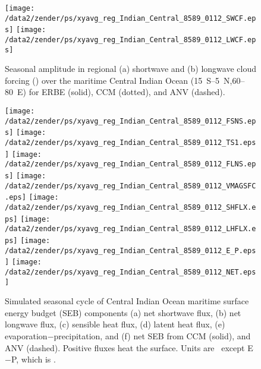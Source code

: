 \documentclass[twocolumn,final]{article}
\begin{document}
\begin{figure}
\begin{center}
\texttt{[image: /data2/zender/ps/xyavg\_reg\_Indian\_Central\_8589\_0112\_SWCF.eps]}\vfill
\texttt{[image: /data2/zender/ps/xyavg\_reg\_Indian\_Central\_8589\_0112\_LWCF.eps]}\vfill
\end{center}
\caption[Seasonal amplitude in regional shortwave and longwave
cloud forcing over the maritime Central Indian Ocean
for ERBE, CCM, and ANV]{
Seasonal amplitude in regional (a) shortwave and (b) longwave
cloud forcing (\wxmS ) over the maritime Central Indian Ocean
(15~\degreee S--5~\degreee N,60--80~\degreee E) for ERBE (solid), CCM
(dotted), and ANV (dashed).
\label{fig:xyavg_reg_8589_0112_ocean_CF}}
\end{figure}

\begin{figure}
\begin{center}
\texttt{[image: /data2/zender/ps/xyavg\_reg\_Indian\_Central\_8589\_0112\_FSNS.eps]}\vfill
\texttt{[image: /data2/zender/ps/xyavg\_reg\_Indian\_Central\_8589\_0112\_TS1.eps]}\vfill
\texttt{[image: /data2/zender/ps/xyavg\_reg\_Indian\_Central\_8589\_0112\_FLNS.eps]}\vfill
\texttt{[image: /data2/zender/ps/xyavg\_reg\_Indian\_Central\_8589\_0112\_VMAGSFC.eps]}\vfill
\texttt{[image: /data2/zender/ps/xyavg\_reg\_Indian\_Central\_8589\_0112\_SHFLX.eps]}\vfill
\texttt{[image: /data2/zender/ps/xyavg\_reg\_Indian\_Central\_8589\_0112\_LHFLX.eps]}\vfill
\texttt{[image: /data2/zender/ps/xyavg\_reg\_Indian\_Central\_8589\_0112\_E\_P.eps]}\vfill
\texttt{[image: /data2/zender/ps/xyavg\_reg\_Indian\_Central\_8589\_0112\_NET.eps]}\vfill
\end{center}
\caption[Simulated seasonal cycle of Central Indian Ocean 
maritime surface energy budget (SEB) components from CCM and ANV]{ 
Simulated seasonal cycle of Central Indian Ocean 
maritime surface energy budget (SEB) components (a) net shortwave
flux, (b) net longwave flux, (c) sensible heat flux, (d) latent heat
flux, (e) evaporation$-$precipitation, and (f) net SEB from CCM
(solid), and ANV (dashed).  
Positive fluxes heat the surface.
Units are \wxmS\ except E$-$P, which is \mmxday.
\label{fig:xyavg_reg_Indian_Central_8589_0112_SEB}}   
\end{figure}
\clearpage
\end{document}
